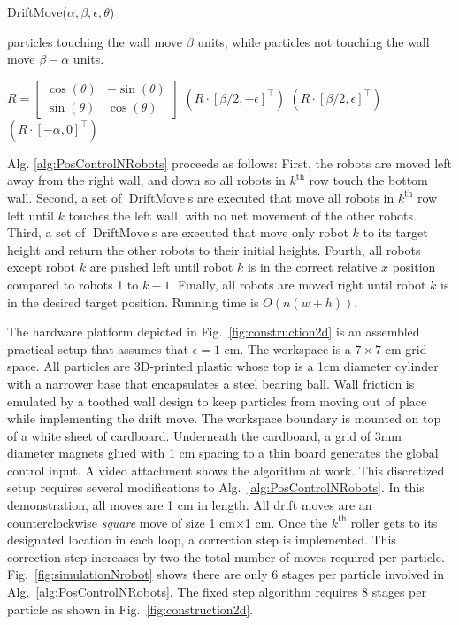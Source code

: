 \begin{algorithm}
\caption{ {\sc DriftMove}($\alpha,\beta,\epsilon,\theta$)
}\label{alg:DriftMove}
particles touching the wall move $\beta$ units, while particles not touching the wall move $\beta-\alpha$ units.
\begin{algorithmic}[1]
\State $R = \begin{bmatrix} \cos(\theta) & -\sin(\theta) \\
 \sin(\theta) & \cos(\theta)  \end{bmatrix}$
$(R \cdot [\beta/2,-\epsilon]^\top)$ 
$(R \cdot [\beta/2,\epsilon]^\top)$ 
$(R \cdot [-\alpha,0]^\top)$ 
\end{algorithmic}
\end{algorithm}


Alg. \ref{alg:PosControlNRobots} proceeds as follows:  
First, the robots are moved left away from the right wall, and down so all robots in $k^{\text{th}}$ row touch the bottom wall.
Second, a set of $\operatorname{DriftMove}$s are executed that move all robots in $k^{\text{th}}$ row left until $k$ touches the left wall, with no net movement of the other robots.
Third, a set of $\operatorname{DriftMove}$s are executed that move only robot $k$ to its target height and return the other robots to their initial heights. 
Fourth, all robots except robot $k$ are pushed left until robot $k$ is in the correct relative $x$ position compared to robots 1 to $k-1$.
Finally, all robots are moved right until robot $k$ is in the desired target position. Running time is $O(n(w+h))$.



The hardware platform depicted in Fig.~\ref{fig:construction2d} is an assembled practical setup that assumes that $\epsilon= 1$ cm. 
The workspace is a $7\times 7$ cm grid space. 
All particles are 3D-printed plastic whose top is a 1cm diameter cylinder with a narrower base that encapsulates a steel bearing ball.
Wall friction is emulated by a toothed wall design to keep particles from moving out of place while implementing the drift move. 
The workspace boundary is mounted on top of a white sheet of cardboard.
Underneath the cardboard, a grid of 3mm diameter magnets glued with 1 cm spacing to a thin board generates the global control input.
 A video attachment  shows the algorithm at work. 
This discretized setup requires several modifications to Alg.~\ref{alg:PosControlNRobots}.
 In this demonstration, all moves are 1 cm in length.
   All drift moves are an counterclockwise \emph{square} move  of size 1 cm$\times$1 cm. 
   Once the $k^{\text{th}}$ roller gets to its designated location in each loop, a correction step is implemented. 
   This correction step increases by two the total number of moves required per particle.
   Fig.~\ref{fig:simulationNrobot} shows there are only 6 stages per particle involved in Alg.~\ref{alg:PosControlNRobots}.
The fixed step algorithm requires 8 stages per particle as shown in Fig.~\ref{fig:construction2d}. 

